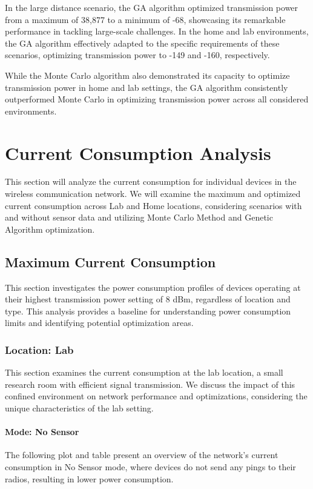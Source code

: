 In the large distance scenario, the GA algorithm optimized transmission power from a maximum of 38,877 to a minimum of -68, showcasing its remarkable performance in tackling large-scale challenges. In the home and lab environments, the GA algorithm effectively adapted to the specific requirements of these scenarios, optimizing transmission power to -149 and -160, respectively.

While the Monte Carlo algorithm also demonstrated its capacity to optimize transmission power in home and lab settings, the GA algorithm consistently outperformed Monte Carlo in optimizing transmission power across all considered environments.


\section{Current Consumption Analysis}
This section will analyze the current consumption for individual devices in the wireless communication network. We will examine the maximum and optimized current consumption across Lab and Home locations, considering scenarios with and without sensor data and utilizing Monte Carlo Method and Genetic Algorithm optimization.

\subsection{Maximum Current Consumption}
This section investigates the power consumption profiles of devices operating at their highest transmission power setting of 8 dBm, regardless of location and type. This analysis provides a baseline for understanding power consumption limits and identifying potential optimization areas.

\subsubsection{Location: Lab}
This section examines the current consumption at the lab location, a small research room with efficient signal transmission. We discuss the impact of this confined environment on network performance and optimizations, considering the unique characteristics of the lab setting.

\paragraph{Mode: No Sensor}
The following plot and table present an overview of the network's current consumption in No Sensor mode, where devices do not send any pings to their radios, resulting in lower power consumption.

